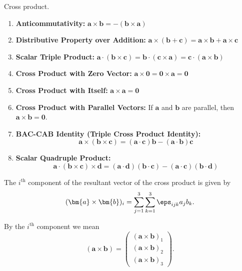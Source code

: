 \documentclass[12pt, a4paper]{article}
\begin{document}
\begin{mdprop}
    Cross product.
    \begin{enumerate}
        \item \textbf{Anticommutativity:} \( \bm{a} \times \bm{b} = -(\bm{b} \times \bm{a}) \)
        
        \item \textbf{Distributive Property over Addition:} \( \bm{a} \times (\bm{b} + \bm{c}) = \bm{a} \times \bm{b} + \bm{a} \times \bm{c} \)
        
        \item \textbf{Scalar Triple Product:} \( \bm{a} \cdot (\bm{b} \times \bm{c}) = \bm{b} \cdot (\bm{c} \times \bm{a}) = \bm{c} \cdot (\bm{a} \times \bm{b}) \)
        
        \item \textbf{Cross Product with Zero Vector:} \( \bm{a} \times \bm{0} = \bm{0} \times \bm{a} = \bm{0} \)
        
        \item \textbf{Cross Product with Itself:} \( \bm{a} \times \bm{a} = \bm{0} \)
        
        \item \textbf{Cross Product with Parallel Vectors:} If \( \bm{a} \) and \( \bm{b} \) are parallel, then \( \bm{a} \times \bm{b} = \bm{0} \).
        
        \item \textbf{BAC-CAB Identity (Triple Cross Product Identity):}
        \[
        \bm{a} \times (\bm{b} \times \bm{c}) = (\bm{a} \cdot \bm{c})\bm{b} - (\bm{a} \cdot \bm{b})\bm{c}
        \]
        
        \item \textbf{Scalar Quadruple Product:}
        \[
        \bm{a} \cdot (\bm{b} \times \bm{c}) \times \bm{d} = (\bm{a} \cdot \bm{d}) (\bm{b} \cdot \bm{c}) - (\bm{a} \cdot \bm{c}) (\bm{b} \cdot \bm{d})
        \]
    \end{enumerate}
\end{mdprop}

\begin{mdthm}
    The \(i^{\text{th}}\) component of the resultant vector of the cross product is given by 
    \[(\bm{a} \times \bm{b})_i = \sum_{j=1}^{3} \sum_{k=1}^{3} \eps_{ijk} a_j b_k.\]
\end{mdthm}

\begin{mdnote}
    By the \(i^{\text{th}}\) component we mean 
    \[(\bm{a} \times \bm{b}) = 
    \begin{pmatrix}
        (\bm{a} \times \bm{b})_1 \\
        (\bm{a} \times \bm{b})_2 \\
        (\bm{a} \times \bm{b})_3
    \end{pmatrix}.\]
\end{mdnote}
\end{document}
